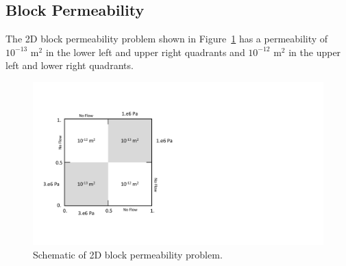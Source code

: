 \documentclass{article}
\begin{document}
\newpage
\subsection{Block Permeability}
The 2D block permeability problem shown in Figure~\ref{fig:2d_block} has a permeability of $10^{-13}$ m$^2$ in the lower left and upper right quadrants and $10^{-12}$ m$^2$ in the upper left and lower right quadrants.
\begin{figure}[htbp]
  \centering
  \includegraphics[width=0.9\linewidth]{figs/2d_block.pdf}
  \caption{Schematic of 2D block permeability problem.}
  \label{fig:2d_block}
\end{figure}
\end{document}
